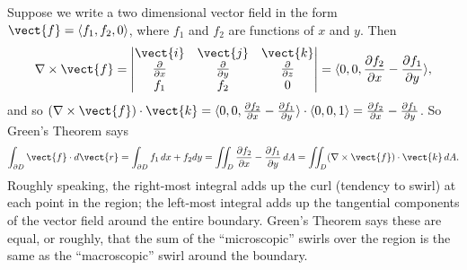 Suppose we write a two dimensional vector field in the
form $\vect{f}=\langle f_1,f_2,0\rangle$, where $f_1$ and $f_2$ are functions
of $x$ and $y$. Then 
$$\nabla\times \vect{f} =
\left|
\begin{matrix}
\vect{i}	&	\vect{j}	&	\vect{k}	\\
{\partial \over\partial x}	&	{\partial\over\partial y}	&	{\partial \over\partial z}	\\
f_1	&	f_2	&	0
\end{matrix}
\right|=
\langle 0,0,{\partial f_2\over\partial x}-{\partial f_1\over\partial y}\rangle,$$
and so $(\nabla\times \vect{f})\cdot\vect{k}=\langle 0,0,{\partial f_2\over\partial x}-{\partial f_1\over\partial y}\rangle\cdot
\langle 0,0,1\rangle = {\partial f_2\over\partial x}-{\partial f_1\over\partial y}$. So Green's Theorem says
\begin{equation}\label{eq:greens theorem second form}
\int_{\partial D} \vect{f}\cdot d\vect{r}=
\int_{\partial D} f_1\,dx +f_2dy = \iint_{D} {\partial f_2\over\partial x}   - {\partial f_1\over\partial y}   \,dA
=\iint_{D}(\nabla\times \vect{f})\cdot\vect{k}\,dA.
\end{equation}
Roughly speaking, the right-most integral adds up the curl (tendency
to swirl) at each point in the region; the left-most integral adds up
the tangential components of the vector field around the entire
boundary. Green's Theorem says these are equal, or roughly, that the
sum of the ``microscopic'' swirls over the region is the same as the
``macroscopic'' swirl around the boundary.

